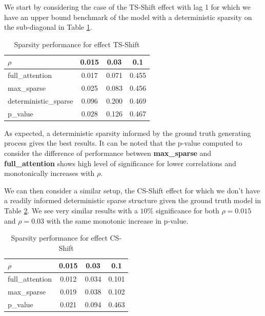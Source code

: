 \documentclass{article}
\begin{document}
We start by considering the case of the TS-Shift effect with lag 1 for which we have an upper bound benchmark of the model with a deterministic sparsity on the sub-diagonal in Table \ref{tab:shift_ts_sparse}.

\begin{table}[t]
    \centering
\begin{tabular}{lccc}
\toprule
$\rho$ & 0.015 & 0.03 & 0.1 \\
\midrule
full\_attention & {\cellcolor[HTML]{3B4CC0}} \color[HTML]{F1F1F1} 0.017 & {\cellcolor[HTML]{3B4CC0}} \color[HTML]{F1F1F1} 0.071 & {\cellcolor[HTML]{3B4CC0}} \color[HTML]{F1F1F1} 0.455 \\
max\_sparse & {\cellcolor[HTML]{5B7AE5}} \color[HTML]{F1F1F1} 0.025 & {\cellcolor[HTML]{5673E0}} \color[HTML]{F1F1F1} 0.083 & {\cellcolor[HTML]{516DDB}} \color[HTML]{F1F1F1} 0.456 \\
deterministic\_sparse & {\cellcolor[HTML]{B40426}} \color[HTML]{F1F1F1} 0.096 & {\cellcolor[HTML]{B40426}} \color[HTML]{F1F1F1} 0.200 & {\cellcolor[HTML]{B40426}} \color[HTML]{F1F1F1} 0.469 \\
p\_value & 0.028 & 0.126 & 0.467 \\
\bottomrule
\end{tabular}
\vskip 0.05in
\caption{Sparsity performance for effect TS-Shift}
    \label{tab:shift_ts_sparse}
\end{table}

As expected, a deterministic sparsity informed by the ground truth generating process gives the best results. It can be noted that the p-value computed to consider the difference of performance between \textbf{max\_sparse} and \textbf{full\_attention} shows high level of significance for lower correlations and monotonically increases with $\rho$.

We can then consider a similar setup, the CS-Shift effect for which we don't have a readily informed deterministic sparse structure given the ground truth model in Table \ref{tab:shift_cs_sparse}. We see very similar results with a $10\%$ significance for both $\rho = 0.015$ and $\rho = 0.03$ with the same monotonic increase in p-value.



\begin{table}[t]
    \centering
\begin{tabular}{lccc}
\toprule
$\rho$ & 0.015 & 0.03 & 0.1 \\
\midrule
full\_attention & {\cellcolor[HTML]{3B4CC0}} \color[HTML]{F1F1F1} 0.012 & {\cellcolor[HTML]{3B4CC0}} \color[HTML]{F1F1F1} 0.034 & {\cellcolor[HTML]{3B4CC0}} \color[HTML]{F1F1F1} 0.101 \\
max\_sparse & {\cellcolor[HTML]{B40426}} \color[HTML]{F1F1F1} 0.019 & {\cellcolor[HTML]{B40426}} \color[HTML]{F1F1F1} 0.038 & {\cellcolor[HTML]{B40426}} \color[HTML]{F1F1F1} 0.102 \\
p\_value & 0.021 & 0.094 & 0.463 \\
\bottomrule
\end{tabular}
\vskip 0.05in
\caption{Sparsity performance for effect CS-Shift}
    \label{tab:shift_cs_sparse}
\end{table}
\end{document}

